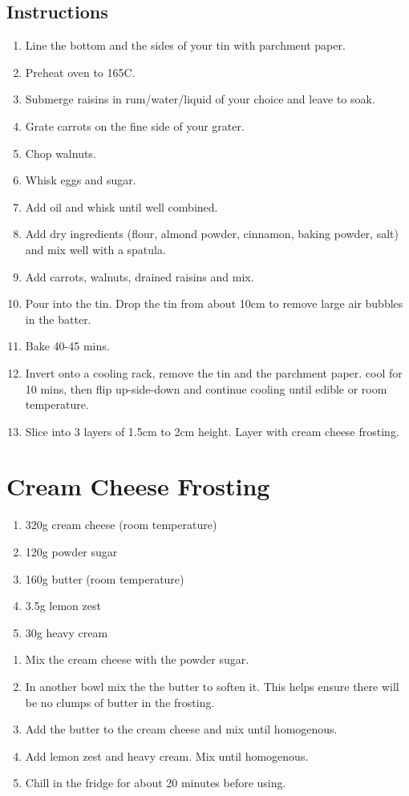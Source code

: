 \subsection*{Instructions}
\begin{enumerate}
  \item Line the bottom and the sides of your tin with parchment paper.
  \item Preheat oven to 165C.
  \item Submerge raisins in rum/water/liquid of your choice and leave to soak.
  \item Grate carrots on the fine side of your grater.
  \item Chop walnuts.
  \item Whisk eggs and sugar.
  \item Add oil and whisk until well combined.
  \item Add dry ingredients (flour, almond powder, cinnamon, baking powder,
  salt) and mix well with a spatula.
  \item Add carrots, walnuts, drained raisins and mix.
  \item Pour into the tin. Drop the tin from about 10cm to remove large air
  bubbles in the batter.
  \item Bake 40-45 mins.
  \item Invert onto a cooling rack, remove the tin and the parchment paper.
  cool for 10 mins, then flip up-side-down and continue cooling until edible or
  room temperature.
  \item Slice into 3 layers of 1.5cm to 2cm height. Layer with cream cheese
  frosting.
\end{enumerate}

\section{Cream Cheese Frosting}

\begin{enumerate}
  \item 320g cream cheese (room temperature)
  \item 120g powder sugar
  \item 160g butter (room temperature)
  \item 3.5g lemon zest
  \item 30g heavy cream
\end{enumerate}

\begin{enumerate}
 \item Mix the cream cheese with the powder sugar.
 \item In another bowl mix the the butter to soften it. This helps ensure there
 will be no clumps of butter in the frosting.
 \item Add the butter to the cream cheese and mix until homogenous.
 \item Add lemon zest and heavy cream. Mix until homogenous.
 \item Chill in the fridge for about 20 minutes before using.
\end{enumerate}


